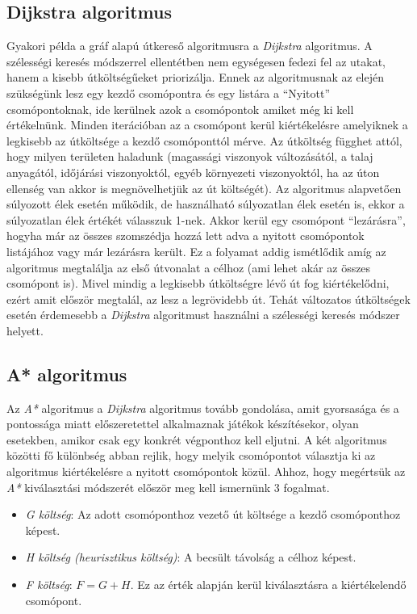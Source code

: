 \subsection{Dijkstra algoritmus}

\noindent Gyakori példa a gráf alapú útkereső algoritmusra a \textit{Dijkstra} algoritmus. A szélességi keresés módszerrel ellentétben nem egységesen fedezi fel az utakat, hanem a kisebb útköltségűeket priorizálja. Ennek az algoritmusnak az elején szükségünk lesz egy kezdő csomópontra és egy listára a “Nyitott” csomópontoknak, ide kerülnek azok a csomópontok amiket még ki kell értékelnünk. Minden iterációban az a csomópont kerül kiértékelésre amelyiknek a legkisebb az útköltsége a kezdő csomóponttól mérve. Az útköltség függhet attól, hogy milyen területen haladunk (magassági viszonyok változásától, a talaj anyagától, időjárási viszonyoktól, egyéb környezeti viszonyoktól, ha az úton ellenség van akkor is megnövelhetjük az út költségét). Az algoritmus alapvetően súlyozott élek esetén működik, de használható súlyozatlan élek esetén is, ekkor a súlyozatlan élek értékét válasszuk 1-nek. Akkor kerül egy csomópont “lezárásra”, hogyha már az összes szomszédja hozzá lett adva a nyitott csomópontok listájához vagy már lezárásra került. Ez a folyamat addig ismétlődik amíg az algoritmus megtalálja az első útvonalat a célhoz (ami lehet akár az összes csomópont is). Mivel mindig a legkisebb útköltségre lévő út fog kiértékelődni, ezért amit először megtalál, az lesz a legrövidebb út. Tehát változatos útköltségek esetén érdemesebb a \textit{Dijkstra} algoritmust használni a szélességi keresés módszer helyett.

\subsection{A* algoritmus}

\noindent Az \textit{A*} algoritmus a \textit{Dijkstra} algoritmus tovább gondolása, amit gyorsasága és a pontossága miatt előszeretettel alkalmaznak játékok készítésekor, olyan esetekben, amikor csak egy konkrét végponthoz kell eljutni. A két algoritmus közötti fő különbség abban rejlik, hogy melyik csomópontot választja ki az algoritmus kiértékelésre a nyitott csomópontok közül. Ahhoz, hogy megértsük az \textit{A*} kiválasztási módszerét először meg kell ismernünk 3 fogalmat.

\begin{itemize}
\item \textit{G költség}: Az adott csomóponthoz vezető út költsége a kezdő csomóponthoz képest.
\item \textit{H költség (heurisztikus költség)}: A becsült távolság a célhoz képest.
\item \textit{F költség}: $F = G + H$. Ez az érték alapján kerül kiválasztásra a kiértékelendő csomópont.
\end{itemize}

